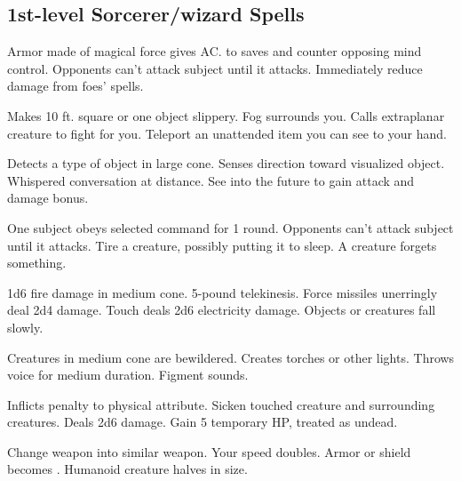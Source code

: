 \subsection{1st-level Sorcerer/wizard Spells}
\begin{swspelllist}
     Armor made of magical force gives  AC.
    to saves and counter opposing mind control.
   Opponents can't attack subject until it attacks.
   Immediately reduce damage from foes' spells.

   Makes 10 ft. square or one object slippery.
   Fog surrounds you.
   Calls extraplanar creature to fight for you.
   Teleport an unattended item you can see to your hand.

   Detects a type of object in large cone.
   Senses direction toward visualized object.
   Whispered conversation at distance.
   See into the future to gain attack and damage bonus.

   One subject obeys selected command for 1 round.
   Opponents can't attack subject until it attacks.
   Tire a creature, possibly putting it to sleep.
   A creature forgets something.

   1d6 fire damage in medium cone.
   5-pound telekinesis.
   Force missiles unerringly deal 2d4 damage.
   Touch deals 2d6 electricity damage.
   Objects or creatures fall slowly.

   Creatures in medium cone are bewildered.
   Creates torches or other lights.
   Throws voice for medium duration.
   Figment sounds.

   Inflicts  penalty to physical attribute.
   Sicken touched creature and surrounding creatures.
   Deals 2d6 damage.
   Gain 5 temporary HP, treated as undead.

   Change weapon into similar weapon.
   Your speed doubles.
   Armor or shield becomes .
   Humanoid creature halves in size.
\end{swspelllist}


